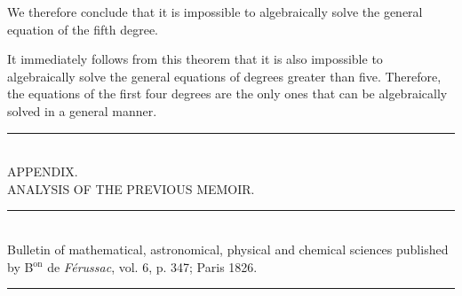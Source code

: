 \documentclass[oneside, 12 pt, leqno]{memoir}
\begin{document}
We therefore conclude that it is impossible to algebraically solve the general equation of the fifth degree.

It immediately follows from this theorem that it is also impossible to algebraically solve the general equations of degrees greater than five. Therefore, the equations of the first four degrees are the only ones that can be algebraically solved in a general manner.
\pagebreak
\begin{center} 
\rule{2in}{0.1pt}\\ [2\baselineskip]
{\large APPENDIX.\\ [\baselineskip]
ANALYSIS OF THE PREVIOUS MEMOIR.\\ [\baselineskip]}
\rule{2in}{0.1pt}\\ [0.5\baselineskip]
{\tiny Bulletin of mathematical, astronomical, physical and chemical sciences published by B\(^{\text{on}}\) de \textit{Férussac}, vol. 6, p. 347; Paris 1826.}\\
\rule{2in}{0.1pt}
\end{center}
\end{document}
